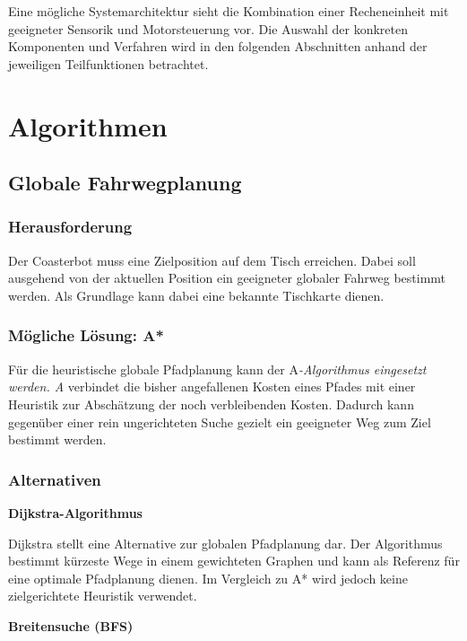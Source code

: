 Eine mögliche Systemarchitektur sieht die Kombination einer
Recheneinheit mit geeigneter Sensorik und Motorsteuerung vor. Die
Auswahl der konkreten Komponenten und Verfahren wird in den folgenden
Abschnitten anhand der jeweiligen Teilfunktionen betrachtet.

\section{Algorithmen}\label{algorithmen}

\subsection{Globale Fahrwegplanung}\label{globale-fahrwegplanung}

\subsubsection{Herausforderung}\label{herausforderung}

Der Coasterbot muss eine Zielposition auf dem Tisch erreichen. Dabei
soll ausgehend von der aktuellen Position ein geeigneter globaler
Fahrweg bestimmt werden. Als Grundlage kann dabei eine bekannte
Tischkarte dienen.

\subsubsection{Mögliche Lösung: A*}\label{muxf6gliche-luxf6sung-a}

Für die heuristische globale Pfadplanung kann der A\emph{-Algorithmus
eingesetzt werden. A} verbindet die bisher angefallenen Kosten eines
Pfades mit einer Heuristik zur Abschätzung der noch verbleibenden
Kosten. Dadurch kann gegenüber einer rein ungerichteten Suche gezielt
ein geeigneter Weg zum Ziel bestimmt werden.

\subsubsection{Alternativen}\label{alternativen}

\textbf{Dijkstra-Algorithmus}

Dijkstra stellt eine Alternative zur globalen Pfadplanung dar. Der
Algorithmus bestimmt kürzeste Wege in einem gewichteten Graphen und kann
als Referenz für eine optimale Pfadplanung dienen. Im Vergleich zu A*
wird jedoch keine zielgerichtete Heuristik verwendet.

\textbf{Breitensuche (BFS)}


